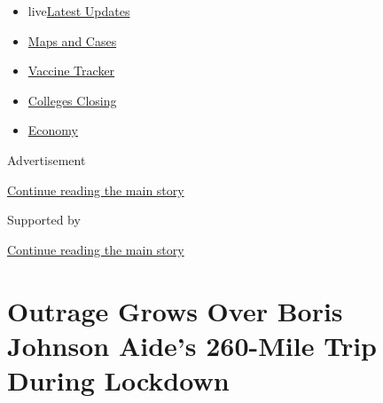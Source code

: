 \begin{itemize}
\tightlist
\item
  live\href{https://www.nytimes3xbfgragh.onion/2020/08/21/world/covid-19-coronavirus.html?name=styln-coronavirus-national\&region=TOP_BANNER\&variant=undefined\&block=storyline_menu_recirc\&action=click\&pgtype=Article\&impression_id=5404bb91-e395-11ea-9f52-e335c4ed056e}{Latest
  Updates}
\item
  \href{https://www.nytimes3xbfgragh.onion/interactive/2020/us/coronavirus-us-cases.html?name=styln-coronavirus-national\&region=TOP_BANNER\&variant=undefined\&block=storyline_menu_recirc\&action=click\&pgtype=Article\&impression_id=5404bb92-e395-11ea-9f52-e335c4ed056e}{Maps
  and Cases}
\item
  \href{https://www.nytimes3xbfgragh.onion/interactive/2020/science/coronavirus-vaccine-tracker.html?name=styln-coronavirus-national\&region=TOP_BANNER\&variant=undefined\&block=storyline_menu_recirc\&action=click\&pgtype=Article\&impression_id=5404bb93-e395-11ea-9f52-e335c4ed056e}{Vaccine
  Tracker}
\item
  \href{https://www.nytimes3xbfgragh.onion/2020/08/19/us/colleges-closing-covid.html?name=styln-coronavirus-national\&region=TOP_BANNER\&variant=undefined\&block=storyline_menu_recirc\&action=click\&pgtype=Article\&impression_id=5404bb94-e395-11ea-9f52-e335c4ed056e}{Colleges
  Closing}
\item
  \href{https://www.nytimes3xbfgragh.onion/live/2020/08/20/business/stock-market-today-coronavirus?name=styln-coronavirus-national\&region=TOP_BANNER\&variant=undefined\&block=storyline_menu_recirc\&action=click\&pgtype=Article\&impression_id=5404bb95-e395-11ea-9f52-e335c4ed056e}{Economy}
\end{itemize}

Advertisement

\protect\hyperlink{after-top}{Continue reading the main story}

Supported by

\protect\hyperlink{after-sponsor}{Continue reading the main story}

\hypertarget{outrage-grows-over-boris-johnson-aides-260-mile-trip-during-lockdown}{%
\section{Outrage Grows Over Boris Johnson Aide's 260-Mile Trip During
Lockdown}\label{outrage-grows-over-boris-johnson-aides-260-mile-trip-during-lockdown}}

